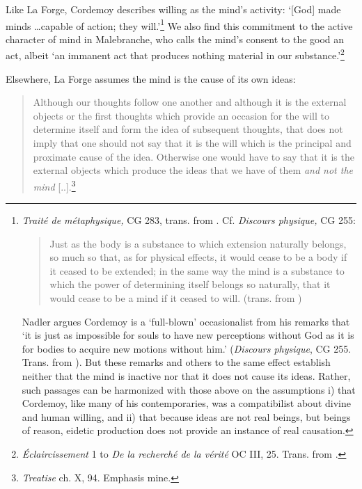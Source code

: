 Like La Forge, Cordemoy describes willing as the mind's activity: `{[}God{]} made minds \ldots capable of action; they will.'\footnote{\emph{Traité de métaphysique,} CG 283, trans. from \autocite[52]{Nadler2005}. Cf. \emph{Discours physique,} CG 255:
	
	\begin{quote}
		Just as the body is a substance to which extension naturally belongs, so much so that, as for physical effects, it would cease to be a body if it ceased to be extended; in the same way the mind is a substance to which the power of determining itself belongs so naturally, that it would cease to be a mind if it ceased to will. (trans. from \autocite[47]{Nadler2005})
	\end{quote}
	
	Nadler argues Cordemoy is a `full-blown' occasionalist from his remarks that `it is just as impossible for souls to have new perceptions without God as it is for bodies to acquire new motions without him.' (\emph{Discours physique}, CG 255. Trans. from \autocite[50]{Nadler2005}). But these remarks and others to the same effect establish neither that the mind is inactive nor that it does not cause its ideas. Rather, such passages can be harmonized with those above on the assumptions i) that Cordemoy, like many of his contemporaries, was a compatibilist about divine and human willing, and ii) that because ideas are not real beings, but beings of reason, eidetic production does not provide an instance of real causation.} We also find this commitment to the active character of mind in Malebranche, who calls the mind's consent to the good an act, albeit `an immanent act that produces nothing material in our substance.'\footnote{\emph{Éclaircissement} 1 to \emph{De la recherché de la vérité} OC III, 25. Trans. from \autocite[52]{Nadler2005}.}

Elsewhere, La Forge assumes the mind is the cause of its own ideas:

\begin{quote}
	Although our thoughts follow one another and although it is the external objects or the first thoughts which provide an occasion for the will to determine itself and form the idea of subsequent thoughts, that does not imply that one should not say that it is the will which is the principal and proximate cause of the idea. Otherwise one would have to say that it is the external objects which produce the ideas that we have of them \emph{and not the mind} {[}..{]}.\footnote{\emph{Treatise} ch. X, 94. Emphasis mine.}
\end{quote}


